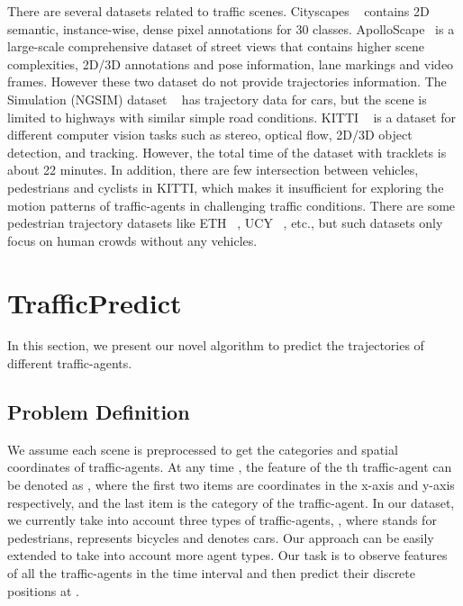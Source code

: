 \documentclass[letterpaper]{article} \usepackage{aaai19}  \usepackage{times}  \usepackage{helvet}  \usepackage{courier}  \usepackage{url}  \usepackage{graphicx}  \usepackage{amsmath}
\begin{document}
There are several datasets related to traffic scenes. Cityscapes ~\cite{cordts2016cityscapes} contains 2D semantic, instance-wise, dense pixel annotations for 30 classes. ApolloScape~\cite{huang2018apolloscape} is a large-scale comprehensive dataset of street views that contains higher scene complexities, 2D/3D annotations and pose information, lane markings and video frames. However these two dataset do not provide trajectories information. The Simulation (NGSIM) dataset ~\cite{USHighway} has trajectory data for cars, but the scene is limited to highways with similar simple road conditions. KITTI ~\cite{geiger2013vision} is a dataset for different computer vision tasks such as stereo, optical ﬂow, 2D/3D object detection, and tracking. However, the total time of the dataset with tracklets is about 22 minutes. In addition, there are few intersection between vehicles, pedestrians and cyclists in KITTI, which makes it insufficient for exploring the motion patterns of traffic-agents in challenging traffic conditions. There are some pedestrian trajectory datasets like ETH ~\cite{pellegrini2009you}, UCY ~\cite{lerner2007crowds}, etc., but such datasets only focus on human crowds without any vehicles.


\section{TrafficPredict}

In this section, we present our novel algorithm to predict the trajectories of different traffic-agents.

\subsection{Problem Definition}

We assume each scene is preprocessed to get the categories and spatial coordinates of traffic-agents. At any time , the feature of the th traffic-agent  can be denoted as , where the first two items are coordinates in the x-axis and y-axis respectively, and the last item is the category of the traffic-agent. In our dataset, we currently take into account three types of traffic-agents, , where  stands for pedestrians,  represents bicycles and  denotes cars. Our approach can be easily extended to take into account more agent types. Our task is to observe features of all the traffic-agents in the time interval  and then predict their discrete positions at . 
\end{document}
